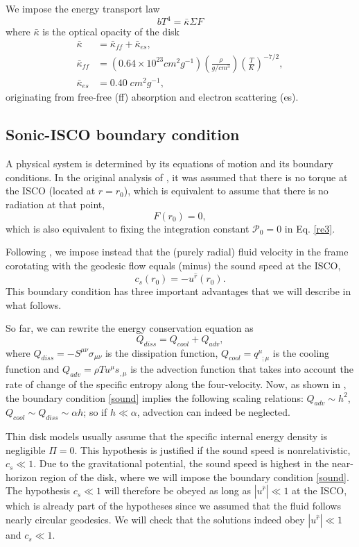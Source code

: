 \documentclass[a4paper,fleqn,usenatbib]{mnrasMOD}
\numberwithin{equation}{section}
\newcommand{\be}{\begin{equation}}
\newcommand{\ee}{\end{equation}}
\begin{document}
We impose the energy transport law
\be \label{vertical equation2}
b T^4 =\bar{\kappa} \Sigma F
\ee
where $\bar\kappa$ is the optical opacity of the disk
\begin{subequations} \label{opacity prescriptions}
\begin{align}
\bar{\kappa} &= \bar{\kappa}_{ff} + \bar{\kappa}_{es},\\
\bar{\kappa}_{ff} &= \left(0.64 \times 10^{23} cm^2 g^{-1}\right)\left(\frac{\rho}{g/cm^3}\right)\left(\frac{T}{K}\right)^{-7/2},\\
\bar{\kappa}_{es} &= 0.40 \; cm^2 g^{-1} ,
\end{align}
\end{subequations}
originating from free-free (ff) absorption and electron scattering (es). 


\subsection{Sonic-ISCO boundary condition}
\label{ISCOBC}

A physical system is determined by its equations of motion and its boundary conditions.  
In the original analysis of \cite{25334}, it was assumed that there is no torque at the ISCO (located at $r=r_0$), which is equivalent to assume that there is no radiation at that point,
\be
F(r_0) = 0,
\ee
which is also equivalent to fixing the integration constant $\mathcal P_0 =0$  in Eq. \eqref{re3}.

Following \cite{Penna:2011rw}, we impose instead that the (purely radial) fluid velocity in the frame corotating with the geodesic flow equals (minus) the sound speed at the ISCO, 
\be
c_s (r_0) =-u^{\hat r}(r_0). \label{sound}
\ee
This boundary condition has three important advantages that we will describe in what follows. 

So far, we can rewrite the energy conservation equation as
\be
Q_{diss} = Q_{cool}+Q_{adv},
\ee
where $Q_{diss} = - S^{\mu\nu} \sigma_{\mu\nu}$ is the dissipation function, $Q_{cool} = q^{\mu}_{\;\; ;\mu}$ is the cooling function and $Q_{adv} = \rho Tu^{\mu}s_{,\mu}$ is the advection function that takes into account the rate of change of the specific entropy along the four-velocity. Now, as shown in \cite{Penna:2011rw}, the boundary condition \eqref{sound} implies the following scaling relations:  $Q_{adv} \sim h^2$, $Q_{cool}\sim Q_{diss} \sim \alpha h$; so if $h \ll \alpha$, advection can indeed be neglected. 

Thin disk models usually assume that the specific internal energy density is negligible $\Pi = 0$. This hypothesis is justified if the sound speed is nonrelativistic, $c_s \ll 1$. Due to the gravitational potential, the sound speed is highest in the near-horizon region of the disk, where we will impose the boundary condition \eqref{sound}. The hypothesis $c_s \ll 1$ will therefore be obeyed as long as $|u^{\hat r}| \ll 1$ at the ISCO, which is already part of the hypotheses since we assumed that the fluid follows nearly circular geodesics. We will check that the solutions indeed obey $|u^{\hat r}| \ll 1$ and $c_s \ll 1$. 
\end{document}
